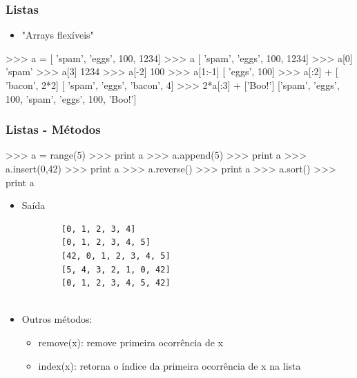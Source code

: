 \documentclass[12pt,t,graphics]{beamer}
\newcommand{\ft}[1]{\frametitle{#1}}
\newcommand{\bi}{\begin{itemize}}
\newcommand{\ei}{\end{itemize}}
\begin{document}

\begin{frame}[fragile]
  \ft{Listas}
  \bi
\item "Arrays flexíveis"
  \ei
  \begin{python}
    >>> a = [ 'spam', 'eggs', 100, 1234]
    >>> a
    [ 'spam', 'eggs', 100, 1234]
    >>> a[0]
    'spam'
    >>> a[3]
    1234
    >>> a[-2]
    100
    >>> a[1:-1]
    [ 'eggs', 100]
    >>> a[:2] + [ 'bacon', 2*2]
    [ 'spam', 'eggs', 'bacon', 4]
    >>> 2*a[:3] + ['Boo!']
    ['spam', 'eggs', 100, 'spam', 'eggs', 100, 'Boo!']		
  \end{python}	
\end{frame}


\begin{frame}[fragile]
  \ft{Listas - Métodos }
  \begin{python}
    >>> a = range(5)
    >>> print a
    >>> a.append(5)
    >>> print a
    >>> a.insert(0,42)
    >>> print a
    >>> a.reverse()
    >>> print a
    >>> a.sort()
    >>> print a	
  \end{python}	
  \bi
\item Saída
  \begin{scriptsize}
\begin{verbatim}
		[0, 1, 2, 3, 4]
		[0, 1, 2, 3, 4, 5]
		[42, 0, 1, 2, 3, 4, 5]
		[5, 4, 3, 2, 1, 0, 42]
		[0, 1, 2, 3, 4, 5, 42]
		
\end{verbatim}
  \end{scriptsize}	
\item Outros métodos:
  \bi
\item remove(x): remove primeira ocorrência de x
\item index(x): retorna o índice da primeira ocorrência de x na lista
  \ei
  \ei	
\end{frame}

\end{document}
